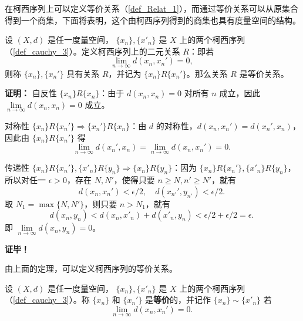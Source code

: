 
在柯西序列上可以定义等价关系（\autoref{def_Relat_1}），而通过等价关系可以从原集合得到一个商集，下面将表明，这个由柯西序列得到的商集也具有度量空间的结构。

\begin{theorem}{}
设 $(X,d)$ 是任一度量空间， $\{x_n\},\{x'_n\}$ 是 $X$ 上的两个柯西序列（\autoref{def_cauchy_3}）。定义柯西序列上的二元关系 $R$：即若
\begin{equation}
\lim_{n\rightarrow\infty}d(x_n,x_n')=0,~
\end{equation}
则称 $\{x_n\},\{x_n'\}$ 具有关系 $R$，并记为 $\{x_n\}R\{x_n'\}$。那么关系 $R$ 是等价关系。
\end{theorem}
\textbf{证明：}
自反性 $\{x_n\}R\{x_n\}$：由于 $d(x_n,x_n)=0$ 对所有 $n$ 成立，因此 $\lim\limits_{n\rightarrow\infty}d(x_n,x_n)=0$ 成立。

对称性 $\{x_n\}R\{x_n'\}\Rightarrow\{x_n'\}R\{x_n\}$：由 $d$ 的对称性，$d(x_n,x_n')=d(x_n',x_n)$，因此由 $\{x_n\}R\{x_n'\}$ 得 
\begin{equation}
\lim_{n\rightarrow\infty}d(x_n',x_n)=\lim_{n\rightarrow\infty}d(x_n,x_n')=0.~
\end{equation}

传递性 $\{x_n\}R\{x_n'\},\{x'_n\}R\{y_n\}\Rightarrow\{x_n\}R\{y_n\}$：因为 $\{x_n\}R\{x_n'\},\{x'_n\}R\{y_n\}$，所以对任一 $\epsilon>0$，存在 $N,N'$，使得只要 $n\geq N,n'\geq N'$，就有
\begin{equation}
d(x_n,x_n')<\epsilon/2,\quad d(x_{n'}',y_{n'})<\epsilon/2.~
\end{equation}
取 $N_1=\max\{N,N'\}$，则只要 $n>N_1$，就有
\begin{equation}
d(x_n,y_n)<d(x_n,x'_n)+d(x'_n,y_n)<\epsilon/2+\epsilon/2=\epsilon.~
\end{equation}
即 $\lim\limits_{n\rightarrow\infty}d(x_n,y_n)=0$。

\textbf{证毕！}

由上面的定理，可以定义柯西序列的等价关系。
\begin{definition}{}
设 $(X,d)$ 是任一度量空间， $\{x_n\},\{x'_n\}$ 是 $X$ 上的两个柯西序列（\autoref{def_cauchy_3}）。称 $\{x_n\}$ 和 $\{x_n'\}$ 是\textbf{等价}的，并记作 $\{x_n\}\sim\{x'_n\}$ 若
\begin{equation}
\lim_{n\rightarrow\infty}d(x_n,x_n')=0.~
\end{equation}
\end{definition}

